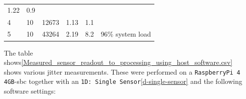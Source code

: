 \begin{longtable}[]{@{}llllll@{}}
\begin{minipage}[t]{0.32\columnwidth}
1.22\strut
\end{minipage} & \begin{minipage}[t]{0.20\columnwidth}\raggedright
0.9\strut
\end{minipage} & \begin{minipage}[t]{0.09\columnwidth}\raggedright
\strut
\end{minipage}\tabularnewline
\begin{minipage}[t]{0.02\columnwidth}\raggedright
4\strut
\end{minipage} & \begin{minipage}[t]{0.04\columnwidth}\raggedright
10\strut
\end{minipage} & \begin{minipage}[t]{0.16\columnwidth}\raggedright
12673\strut
\end{minipage} & \begin{minipage}[t]{0.32\columnwidth}\raggedright
1.13\strut
\end{minipage} & \begin{minipage}[t]{0.20\columnwidth}\raggedright
1.1\strut
\end{minipage} & \begin{minipage}[t]{0.09\columnwidth}\raggedright
\strut
\end{minipage}\tabularnewline
\begin{minipage}[t]{0.02\columnwidth}\raggedright
5\strut
\end{minipage} & \begin{minipage}[t]{0.04\columnwidth}\raggedright
10\strut
\end{minipage} & \begin{minipage}[t]{0.16\columnwidth}\raggedright
43264\strut
\end{minipage} & \begin{minipage}[t]{0.32\columnwidth}\raggedright
2.19\strut
\end{minipage} & \begin{minipage}[t]{0.20\columnwidth}\raggedright
8.2\strut
\end{minipage} & \begin{minipage}[t]{0.09\columnwidth}\raggedright
96\% system load\strut
\end{minipage}\tabularnewline
\bottomrule
\end{longtable}

The table
shows\ref{Measured_sensor_readout_to_processing_using_host_software.csv}
shows various jitter measurements. These were performed on a
\passthrough{\lstinline!RaspberryPi 4 4GB!}-\gls{sbc} together with an
\passthrough{\lstinline!1D: Single Sensor!}\ref{d-single-sensor} and the
following software settings:

